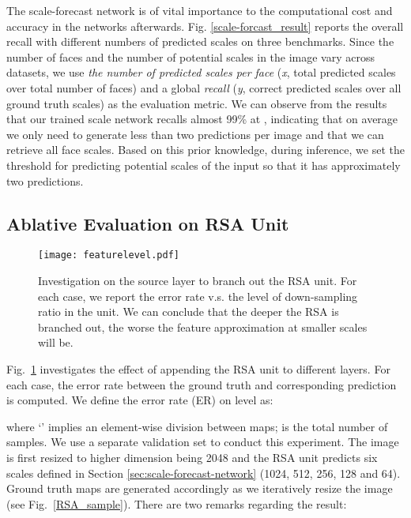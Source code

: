 \documentclass[10pt,twocolumn,letterpaper]{article}
\begin{document}
The scale-forecast network is of vital importance to the computational cost and accuracy in the networks afterwards.
Fig. \ref{scale-forcast_result} reports the overall recall with different numbers of predicted scales on three benchmarks.
Since the number of faces and the number of potential scales in the image vary across datasets, 
we use  \textit{the number of predicted scales per face} (\textit{x}, total predicted scales over total number of faces) and a global \textit{recall} (\textit{y}, correct predicted scales over all ground truth scales) as the evaluation metric. 
We can observe from the results that our trained scale network recalls almost 99\% at , 
indicating that on average we only need to generate less than two predictions per image and that we can retrieve all face scales.
Based on this prior knowledge, during inference, we set the threshold for predicting potential scales of the input so that it has approximately two predictions.



\subsection{Ablative Evaluation on RSA Unit}\label{sec:ablative-evaluation-on-rsa-unit}

\begin{figure}[t]
\begin{center}
   \texttt{[image: featurelevel.pdf]}
\end{center}
\vspace{-.4cm}
\caption{Investigation on the source layer to branch out the RSA unit. 
For each case, we report the error rate v.s. the level of down-sampling ratio in the unit.
We can conclude that the deeper the RSA is branched out, the worse the feature approximation at smaller scales will be.
}
\label{featlevel}
\end{figure}

Fig.~\ref{featlevel} investigates the effect of appending the RSA unit to different layers. For each case, the error
rate between the ground truth and corresponding prediction is computed. We define the error rate (ER) on level  as:

where `' implies an element-wise division between maps;  is the total number of samples. 
We use a separate validation set to conduct this experiment. 
The image is first resized to higher dimension being 2048 and the RSA unit predicts six scales defined in Section \ref{sec:scale-forecast-network} (1024, 512, 256, 128 and 64).
Ground truth maps are generated accordingly as we iteratively resize the image (see Fig.~\ref{RSA_sample}).
There are two remarks regarding the result:
\end{document}
